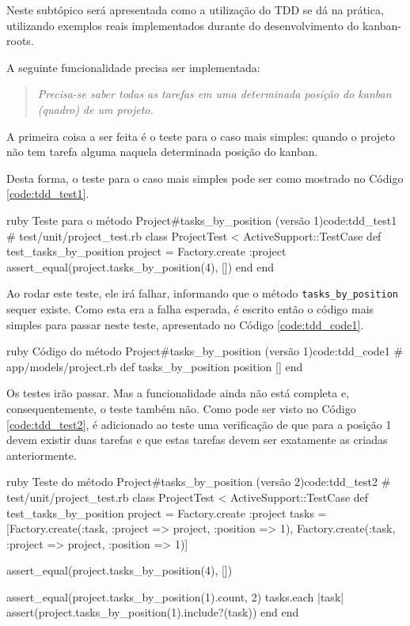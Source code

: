 Neste subtópico será apresentada como a utilização do TDD se dá na prática, utilizando exemplos reais implementados durante do desenvolvimento do kanban-roots.

A seguinte funcionalidade precisa ser implementada:

\begin{quote}
\textit{Precisa-se saber todas as tarefas em uma determinada posição do kanban (quadro) de um projeto.}
\end{quote}

A primeira coisa a ser feita é o teste para o caso mais simples: quando o projeto não tem tarefa alguma naquela determinada posição do kanban.

Desta forma, o teste para o caso mais simples pode ser como mostrado no Código \ref{code:tdd_test1}.

\begin{mycode}{ruby}%
{Teste para o método Project\#tasks\_by\_position (versão 1)}{code:tdd_test1}
# test/unit/project_test.rb
class ProjectTest < ActiveSupport::TestCase
  def test_tasks_by_position
    project = Factory.create :project
    assert_equal(project.tasks_by_position(4), [])
  end
end
\end{mycode}

Ao rodar este teste, ele irá falhar, informando que o método \texttt{tasks\_by\_position} sequer existe. Como esta era a falha esperada, é escrito então o código mais simples para passar neste teste, apresentado no Código \ref{code:tdd_code1}.

\begin{mycode}{ruby}%
{Código do método Project\#tasks\_by\_position (versão 1)}{code:tdd_code1}
# app/models/project.rb
def tasks_by_position position
  []
end
\end{mycode}

Os testes irão passar. Mas a funcionalidade ainda não está completa e, consequentemente, o teste também não. Como pode ser visto no Código \ref{code:tdd_test2}, é adicionado ao teste uma verificação de que para a posição 1 devem existir duas tarefas e que estas tarefas devem ser exatamente as criadas anteriormente.

\begin{mycode}{ruby}%
{Teste do método Project\#tasks\_by\_position (versão 2)}{code:tdd_test2}
# test/unit/project_test.rb
class ProjectTest < ActiveSupport::TestCase
  def test_tasks_by_position
    project = Factory.create :project
    tasks = [Factory.create(:task, :project => project, :position => 1),
             Factory.create(:task, :project => project, :position => 1)]

    assert_equal(project.tasks_by_position(4), [])

    assert_equal(project.tasks_by_position(1).count, 2)
    tasks.each { |task| assert(project.tasks_by_position(1).include?(task)) }
  end
end
\end{mycode}

